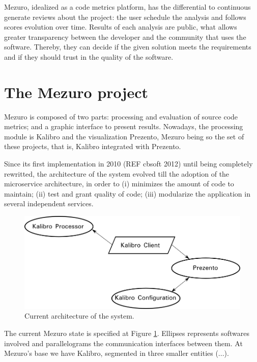 \documentclass{llncs}
\begin{document}
Mezuro, idealized as a code metrics platform, has the differential to
continuous generate reviews about the project: the user schedule the
analysis and follows scores evolution over time. Results of each analysis
are public, what allows greater transparency between the developer and the
community that uses the software. Thereby, they can decide if the given solution
meets the requirements and if they should trust in the quality of the software.

\section{The Mezuro project}
\label{sec:mezuro}

Mezuro is composed of two parts: processing and evaluation of source code
metrics; and a graphic interface to present results. Nowadays, the processing
module is Kalibro and the visualization Prezento, Mezuro being so the set of
these projects, that is, Kalibro integrated with Prezento.

Since its first implementation in 2010 (REF cbsoft 2012) until being completely
rewritted, the architecture of the system evolved till the adoption of the
microservice architecture, in order to (i) minimizes the amount of code to
maintain;
(ii) test and grant quality of code;
(iii) modularize the application in several independent services.

\begin{figure}[H]
  \centering
    \includegraphics[width=\textwidth]{images/mezuro-architecturev2.png}
  \caption{Current architecture of the system.}
  \label{fig:architecture-2}
\end{figure}


The current Mezuro state is specified at Figure \ref{fig:architecture-2}. Ellipses represents
softwares involved and parallelograms the communication interfaces between them. At Mezuro's
base we have Kalibro, segmented in three smaller entities (...).
\end{document}

